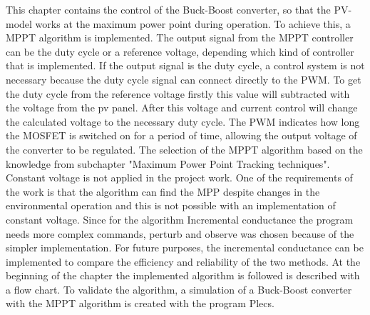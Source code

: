 This chapter contains the control of the Buck-Boost converter, so that the PV-model works at the maximum power point during operation. To achieve this, a MPPT algorithm is implemented. The output signal from the MPPT controller can be the duty cycle or a reference voltage, depending which kind of controller that is implemented. If the output signal is the duty cycle, a control system is not necessary because the duty cycle signal can connect directly to the PWM. To get the duty cycle from the reference voltage firstly this value will subtracted with the voltage from the pv panel. After this voltage and current control will change the calculated voltage to the necessary duty cycle. The PWM indicates how long the MOSFET is switched on for a period of time, allowing the output voltage of the converter to be regulated.
The selection of the MPPT algorithm based on the knowledge from subchapter "Maximum Power Point Tracking techniques".
Constant voltage is not applied in the project work. One of the requirements of the work is that the algorithm can find the MPP despite changes in the environmental operation and this is not possible with an implementation of constant voltage. Since for the algorithm Incremental conductance the program needs more complex commands, perturb and observe was chosen because of the simpler implementation. For future purposes, the incremental conductance can be implemented to compare the efficiency and reliability of the two methods.
At the beginning of the chapter the implemented algorithm is followed is described with a flow chart. To validate the algorithm, a simulation of a Buck-Boost converter with the MPPT algorithm is created with the program Plecs.
